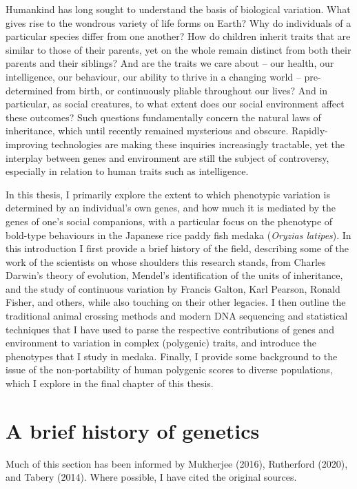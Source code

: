 \documentclass[
]{book}
\begin{document}
Humankind has long sought to understand the basis of biological variation. What gives rise to the wondrous variety of life forms on Earth? Why do individuals of a particular species differ from one another? How do children inherit traits that are similar to those of their parents, yet on the whole remain distinct from both their parents and their siblings? And are the traits we care about -- our health, our intelligence, our behaviour, our ability to thrive in a changing world -- pre-determined from birth, or continuously pliable throughout our lives? And in particular, as social creatures, to what extent does our social environment affect these outcomes? Such questions fundamentally concern the natural laws of inheritance, which until recently remained mysterious and obscure. Rapidly-improving technologies are making these inquiries increasingly tractable, yet the interplay between genes and environment are still the subject of controversy, especially in relation to human traits such as intelligence.

In this thesis, I primarily explore the extent to which phenotypic variation is determined by an individual's own genes, and how much it is mediated by the genes of one's social companions, with a particular focus on the phenotype of bold-type behaviours in the Japanese rice paddy fish medaka (\emph{Oryzias latipes}). In this introduction I first provide a brief history of the field, describing some of the work of the scientists on whose shoulders this research stands, from Charles Darwin's theory of evolution, Mendel's identification of the units of inheritance, and the study of continuous variation by Francis Galton, Karl Pearson, Ronald Fisher, and others, while also touching on their other legacies. I then outline the traditional animal crossing methods and modern DNA sequencing and statistical techniques that I have used to parse the respective contributions of genes and environment to variation in complex (polygenic) traits, and introduce the phenotypes that I study in medaka. Finally, I provide some background to the issue of the non-portability of human polygenic scores to diverse populations, which I explore in the final chapter of this thesis.

\hypertarget{a-brief-history-of-genetics}{%
\section{A brief history of genetics}\label{a-brief-history-of-genetics}}

Much of this section has been informed by Mukherjee (2016), Rutherford (2020), and Tabery (2014). Where possible, I have cited the original sources.
\end{document}
